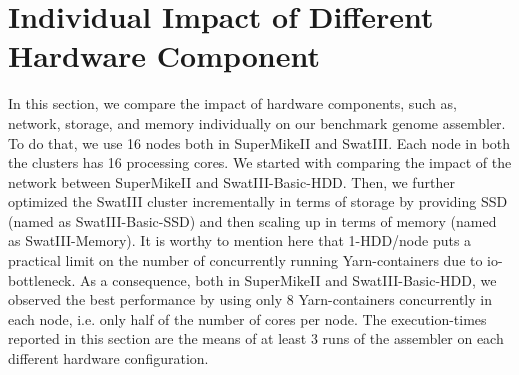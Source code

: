 \documentclass[conference]{IEEEtran}
\begin{document}
\section {Individual Impact of Different Hardware Component} \label{IndividualImpactofDifferentHardwareConfiguration}
In this section, we compare the impact of hardware components, such as, network, storage, and memory individually on our benchmark genome assembler.
To do that, we use 16 nodes both in SuperMikeII and SwatIII. Each node in both the clusters has 16 processing cores.
We started with comparing the impact of the network between SuperMikeII and SwatIII-Basic-HDD.
Then, we further optimized the SwatIII cluster incrementally in terms of storage by providing SSD (named as SwatIII-Basic-SSD) and then scaling up in terms of memory (named as SwatIII-Memory).
It is worthy to mention here that 1-HDD/node puts a practical limit on the number of concurrently running Yarn-containers due to io-bottleneck.
As a consequence, both in SuperMikeII and SwatIII-Basic-HDD, we observed the best performance by using only 8 Yarn-containers concurrently in each node, i.e. only half of the number of cores per node.
The execution-times reported in this section are the means of at least 3 runs of the assembler on each different hardware configuration.
\label{IndividualHWEffect}
\end{document}
